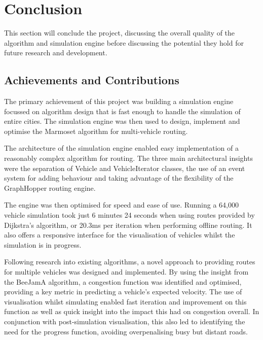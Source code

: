 \documentclass[ %
                    author={Alexander Hill},
                supervisor={Dr. Benjamin Sach},
                    degree={MEng},
                     title={MARMOSET},
                  subtitle={Multi-Agent Route Management using Online Simulation for Efficient Transportation},
                      type={research},
                      year={2016} ]{dissertation}
\begin{document}

\chapter{Conclusion}
\label{chap:conclusion}

This section will conclude the project, discussing the overall quality of the
algorithm and simulation engine before discussing the potential they hold for
future research and development.

\section{Achievements and Contributions}

The primary achievement of this project was building a simulation engine focussed
on algorithm design that is fast enough to handle the simulation of entire cities.
The simulation engine was then used to design, implement and optimise the
Marmoset algorithm for multi-vehicle routing.

The architecture of the simulation engine enabled easy implementation of a
reasonably complex algorithm for routing. The three main architectural insights
were the separation of Vehicle and VehicleIterator classes, the use of an event
system for adding behaviour and taking advantage of the flexibility of the
GraphHopper routing engine.

The engine was then optimised for speed and ease of use. Running a 64,000
vehicle simulation took just 6 minutes 24 seconds when using routes provided by
Dijkstra's algorithm, or 20.3ms per iteration when performing offline routing.
It also offers a responsive interface for the visualisation of vehicles whilst
the simulation is in progress.

Following research into existing algorithms, a novel approach to providing
routes for multiple vehicles was designed and implemented. By using the insight
from the BeeJamA algorithm, a congestion function was identified and optimised,
providing a key metric in predicting a vehicle's expected velocity. The use of
visualisation whilst simulating enabled fast iteration and improvement on this
function as well as quick insight into the impact this had on congestion
overall. In conjunction with post-simulation visualisation, this also led to
identifying the need for the progress function, avoiding overpenalising busy but
distant roads.
\end{document}
